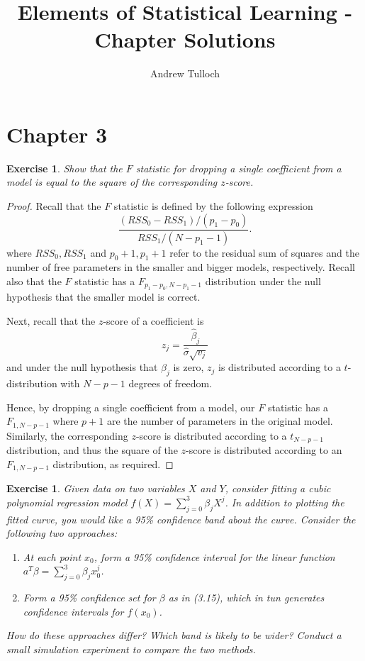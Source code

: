 \documentclass[12pt]{amsart}
\title{Elements of Statistical Learning - Chapter Solutions}								%
\author{Andrew Tulloch}
\theoremstyle{plain}%
\newtheorem{exer}[thm]{Exercise}
\theoremstyle{definition}
\theoremstyle{remark}
\begin{document}
\maketitle
\setcounter{section}{2}

\section{Chapter 3}

\begin{exer}
  Show that the $F$ statistic for dropping a single coefficient from a model is equal to the square of the corresponding $z$-score.
\end{exer}

\begin{proof}
  Recall that the $F$ statistic is defined by the following expression \[
    \frac{(RSS_0 - RSS_1) / (p_1 - p_0)}{RSS_1 / (N - p_1 - 1)}.
  \] where $RSS_0, RSS_1$ and $p_0 + 1, p_1 + 1$ refer to the residual sum of squares and the number of free parameters in the smaller and bigger models, respectively.  Recall also that the $F$ statistic has a $F_{p_1 - p_0, N-p_1 - 1}$ distribution under the null hypothesis that the smaller model is correct.

  Next, recall that the $z$-score of a coefficient is \[
    z_j = \frac{\hat \beta_j}{\hat \sigma \sqrt{v_j}}
  \] and under the null hypothesis that $\beta_j$ is zero, $z_j$ is distributed according to a $t$-distribution with $N-p-1$ degrees of freedom. 

  Hence, by dropping a single coefficient from a model, our $F$ statistic has a $F_{1, N-p - 1}$ where $p + 1$ are the number of parameters in the original model.  Similarly, the corresponding $z$-score is distributed according to a $t_{N-p-1}$ distribution, and thus the square of the $z$-score is distributed according to an $F_{1, N-p-1}$ distribution, as required.
\end{proof}
\begin{exer}
    Given data on two variables $X$ and $Y$, consider fitting a cubic polynomial regression model $f(X) = \sum_{j=0}^{3} \beta_j X^j$.  In addition to plotting the fitted curve, you would like a 95\% confidence band about the curve.  Consider the following two approaches:
\begin{enumerate}
    \item At each point $x_0$, form a 95\% confidence interval for the linear function $a^T \beta = \sum_{j=0}^{3}\beta_j x_0^j$.  
    \item Form a 95\% confidence set for $\beta$ as in (3.15), which in tun generates confidence intervals for $f(x_0)$.  
\end{enumerate}
   How do these approaches differ?  Which band is likely to be wider?  Conduct a small simulation experiment to compare the two methods.
\end{exer}
\end{document}

